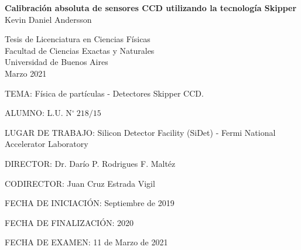 \documentclass[a4paper,12pt]{report} %
\begin{document}
\begin{titlepage}
    \begin{center}
        \doublespacing
    
        \vspace*{150pt}
        \textbf{Calibración absoluta de sensores CCD utilizando la tecnología Skipper}\\
    
        \vspace*{20pt}
        Kevin Daniel Andersson
    
        \vspace{230pt}
        Tesis de Licenciatura en Ciencias Físicas\\Facultad de Ciencias Exactas y Naturales\\Universidad de Buenos Aires\\\vspace{30pt}Marzo 2021
    \end{center}

\newpage
\thispagestyle{empty} \mbox{}
\thispagestyle{empty}
\end{titlepage}


\thispagestyle{empty}
TEMA: Física de partículas - Detectores Skipper CCD.

ALUMNO: L.U. N$^\circ\ 218/15$

LUGAR DE TRABAJO: Silicon Detector Facility (SiDet) - Fermi National Accelerator Laboratory

DIRECTOR: Dr. Darío P. Rodrigues F. Maltéz

CODIRECTOR: Juan Cruz Estrada Vigil

FECHA DE INICIACIÓN: Septiembre de 2019

FECHA DE FINALIZACIÓN:  2020 

FECHA DE EXAMEN:  11 de Marzo de 2021
\end{document}
